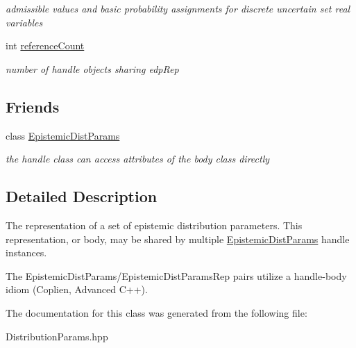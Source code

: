 \begin{DoxyCompactItemize}
\begin{DoxyCompactList}\small\item\em admissible values and basic probability assignments for discrete uncertain set real variables \end{DoxyCompactList}\item 
int \hyperlink{classPecos_1_1EpistemicDistParamsRep_afff0b6144883d3ca09a8d0d3f4776b0f}{reference\+Count}\label{classPecos_1_1EpistemicDistParamsRep_afff0b6144883d3ca09a8d0d3f4776b0f}

\begin{DoxyCompactList}\small\item\em number of handle objects sharing edp\+Rep \end{DoxyCompactList}\end{DoxyCompactItemize}
\subsection*{Friends}
\begin{DoxyCompactItemize}
\item 
class \hyperlink{classPecos_1_1EpistemicDistParamsRep_a2a3370b29dbf1ac16f49b525603d2e96}{Epistemic\+Dist\+Params}\label{classPecos_1_1EpistemicDistParamsRep_a2a3370b29dbf1ac16f49b525603d2e96}

\begin{DoxyCompactList}\small\item\em the handle class can access attributes of the body class directly \end{DoxyCompactList}\end{DoxyCompactItemize}


\subsection{Detailed Description}
The representation of a set of epistemic distribution parameters. This representation, or body, may be shared by multiple \hyperlink{classPecos_1_1EpistemicDistParams}{Epistemic\+Dist\+Params} handle instances. 

The Epistemic\+Dist\+Params/\+Epistemic\+Dist\+Params\+Rep pairs utilize a handle-\/body idiom (Coplien, Advanced C++). 

The documentation for this class was generated from the following file\+:\begin{DoxyCompactItemize}
\item 
Distribution\+Params.\+hpp\end{DoxyCompactItemize}
